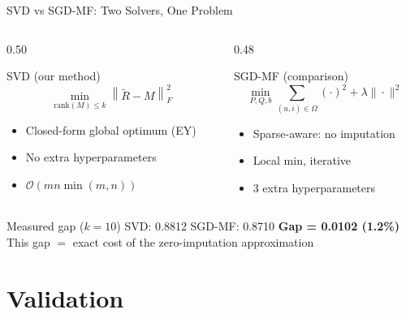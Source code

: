 \documentclass[10pt,t]{beamer}
\newcommand{\FroSq}[1]{\left\|#1\right\|_F^2}
\newcommand{\Om}{\Omega}
\begin{document}
\begin{frame}{SVD vs SGD-MF: Two Solvers, One Problem}
  \begin{columns}[t]
    \begin{column}{0.50\textwidth}
      \begin{block}{SVD (our method)}
        \[
          \min_{\mathrm{rank}(M)\leq k}\FroSq{\tilde{R}-M}
        \]
        \begin{itemize}
          \item Closed-form global optimum (EY)
          \item No extra hyperparameters
          \item $\mathcal{O}(mn\min(m,n))$
        \end{itemize}
      \end{block}
    \end{column}
    \begin{column}{0.48\textwidth}
      \begin{block}{SGD-MF (comparison)}
        \[
          \min_{P,Q,b}\sum_{(u,i)\in\Om}(\cdot)^2 + \lambda\|\cdot\|^2
        \]
        \begin{itemize}
          \item Sparse-aware: no imputation
          \item Local min, iterative
          \item 3 extra hyperparameters
        \end{itemize}
      \end{block}
    \end{column}
  \end{columns}

  \vspace{0.6em}
  \begin{alertblock}{Measured gap ($k=10$)}
    SVD: 0.8812 \quad SGD-MF: 0.8710 \quad
    \textbf{Gap = 0.0102\; (1.2\%)}\\
    \small This gap $=$ exact cost of the zero-imputation approximation
  \end{alertblock}
\end{frame}

\section{Validation}
\end{document}
